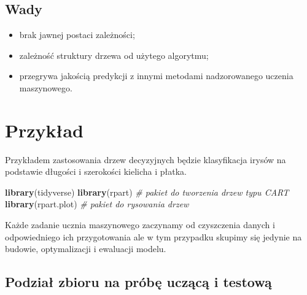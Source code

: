 \documentclass[]{book}
\newenvironment{Shaded}{\begin{snugshade}}{\end{snugshade}}
\newcommand{\CommentTok}[1]{\textcolor[rgb]{0.56,0.35,0.01}{\textit{#1}}}
\newcommand{\DataTypeTok}[1]{\textcolor[rgb]{0.13,0.29,0.53}{#1}}
\newcommand{\DecValTok}[1]{\textcolor[rgb]{0.00,0.00,0.81}{#1}}
\newcommand{\FloatTok}[1]{\textcolor[rgb]{0.00,0.00,0.81}{#1}}
\newcommand{\KeywordTok}[1]{\textcolor[rgb]{0.13,0.29,0.53}{\textbf{#1}}}
\newcommand{\NormalTok}[1]{#1}
\newcommand{\OperatorTok}[1]{\textcolor[rgb]{0.81,0.36,0.00}{\textbf{#1}}}
\newcommand{\StringTok}[1]{\textcolor[rgb]{0.31,0.60,0.02}{#1}}
\providecommand{\tightlist}{%
  \setlength{\itemsep}{0pt}\setlength{\parskip}{0pt}}
\theoremstyle{plain}
\theoremstyle{definition}
\begin{document}
\hypertarget{wady}{%
\subsection{Wady}\label{wady}}

\begin{itemize}
\tightlist
\item
  brak jawnej postaci zależności;
\item
  zależność struktury drzewa od użytego algorytmu;
\item
  przegrywa jakością predykcji z innymi metodami nadzorowanego uczenia maszynowego.
\end{itemize}

\hypertarget{przyk41}{%
\section{Przykład}\label{przyk41}}

Przykładem zastosowania drzew decyzyjnych będzie klasyfikacja irysów na podstawie długości i szerokości kielicha i płatka.

\begin{Shaded}
\begin{Highlighting}[]
\KeywordTok{library}\NormalTok{(tidyverse) }
\KeywordTok{library}\NormalTok{(rpart) }\CommentTok{# pakiet do tworzenia drzew typu CART}
\KeywordTok{library}\NormalTok{(rpart.plot) }\CommentTok{# pakiet do rysowania drzew}
\end{Highlighting}
\end{Shaded}

Każde zadanie ucznia maszynowego zaczynamy od czyszczenia danych i odpowiedniego ich przygotowania ale w tym przypadku skupimy się jedynie na budowie, optymalizacji i ewaluacji modelu.

\hypertarget{podzia-zbioru-na-probe-uczaca-i-testowa}{%
\subsection{Podział zbioru na próbę uczącą i testową}\label{podzia-zbioru-na-probe-uczaca-i-testowa}}

\begin{Shaded}
\end{Shaded}
\end{document}
